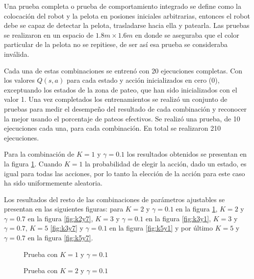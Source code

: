 Una prueba completa o prueba de comportamiento integrado se define como la colocaci\'on del robot y la pelota en posiones iniciales arbitrarias, entonces el robot debe se capaz de detectar la pelota, trasladarse hacia ella y patearla. Las pruebas se realizaron en un espacio de $1.8 m \times 1.6 m$
en donde se aseguraba que el color particular de la pelota no se repitiese, de ser así esa prueba se consideraba inválida.

Cada una de estas combinaciones se entrenó con 20 ejecuciones completas. Con los valores $Q(s,a)$ para cada estado y acción inicializados en cero (0), exceptuando los estados de la zona de pateo, que han sido inicializados con el valor 1. Una vez completados los entrenamientos se realizó un conjunto de pruebas para medir el desempeño del resultado de cada combinación y reconocer la mejor usando el porcentaje de pateos efectivos. Se realizó una prueba, de 10 ejecuciones cada una, para cada combinación. En total se realizaron 210 ejecuciones. 

Para la combinaci\'on de $K = 1$ y $ \gamma = 0.1 $ los resultados obtenidos se presentan en la figura  \ref{fig:k1y1}. Cuando $K = 1$ la probabilidad de elegir la acci\'on, dado un estado, es igual para todas las acciones, por lo tanto la elección de la acción para este caso ha sido uniformemente aleatoria. 

Los resultados del resto de las combinaciones de par\'ametros ajustables se presentan en las siguientes figuras: para $K = 2$ y $ \gamma = 0.1 $ en la figura \ref{fig:k1y1}, $K = 2$ y $ \gamma = 0.7 $ en la figura \ref{fig:k2y7}, $K = 3$ y $ \gamma = 0.1 $ en la figura \ref{fig:k3y1}, $K = 3$ y $ \gamma = 0.7 $, $K = 5$ \ref{fig:k3y7} y $ \gamma = 0.1 $ en la figura \ref{fig:k5y1} y por último $K = 5$ y $ \gamma = 0.7 $ en la figura \ref{fig:k5y7}.


\begin{figure}
\caption{Prueba con  $K = 1$ y $ \gamma = 0.1 $}
\label{fig:k1y1}
\end{figure} 

\begin{figure}[h]
\caption{Prueba con $K = 2$ y $ \gamma = 0.1 $}
\label{fig:k2y1}
\end{figure} 

